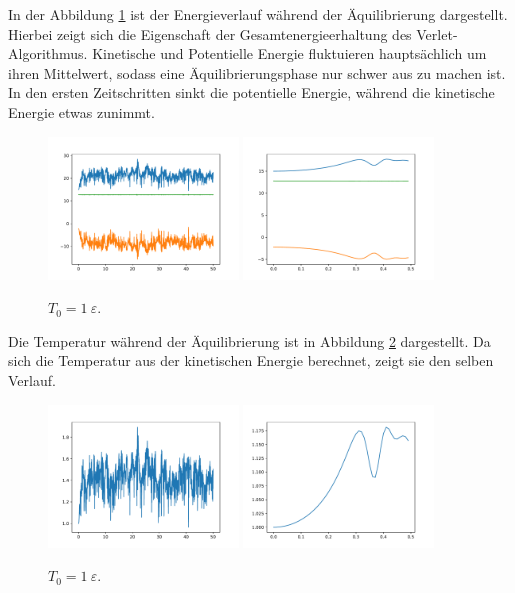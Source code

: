 In der Abbildung \ref{fig:e1} ist der Energieverlauf während der
Äquilibrierung dargestellt.
Hierbei zeigt sich die Eigenschaft der Gesamtenergieerhaltung des Verlet-Algorithmus.
Kinetische und Potentielle Energie fluktuieren hauptsächlich um ihren Mittelwert,
sodass eine Äquilibrierungsphase nur schwer aus zu machen ist. In den ersten
Zeitschritten sinkt die potentielle Energie, während die kinetische Energie etwas zunimmt.
\begin{figure}
    \centering
    \includegraphics[width=0.45\textwidth]{A1/build/aequi1_E.pdf}
    \includegraphics[width=0.45\textwidth]{A1/build/aequi1_EE.pdf}
    \caption{ $T_0 = 1\:\varepsilon$.}
    \label{fig:e1}
\end{figure}

Die Temperatur während der Äquilibrierung ist in Abbildung \ref{fig:T1}
dargestellt. Da sich die Temperatur aus der kinetischen Energie berechnet, zeigt sie
den selben Verlauf.
\begin{figure}
    \centering
    \includegraphics[width=0.45\textwidth]{A1/build/aequi1_T.pdf}
    \includegraphics[width=0.45\textwidth]{A1/build/aequi1_TT.pdf}
    \caption{$T_\text{0} = 1\:\varepsilon$.}
    \label{fig:T1}
\end{figure}

